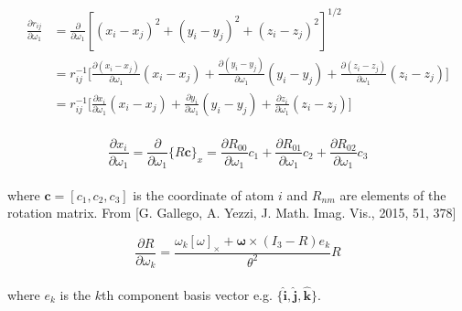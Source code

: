 \documentclass[10pt]{article}
\begin{document}
\begin{equation}
\begin{aligned}
\frac{\partial r_{ij}}{\partial \omega_1} &=  \frac{\partial }{\partial \omega_1} [(x_i - x_j)^2 + (y_i - y_j)^2 + (z_i - z_j)^2]^{1/2} \\
&=r_{ij}^{-1} {\Big [} \frac{\partial (x_i - x_j)}{\partial \omega_1}(x_i - x_j) + \frac{\partial (y_i - y_j)}{\partial \omega_1}(y_i - y_j) + \frac{\partial (z_i - z_j)}{\partial \omega_1}(z_i - z_j)  {\Big ]} \\
&= r_{ij}^{-1} {\Big [} \frac{\partial x_i}{\partial \omega_1}(x_i - x_j) + \frac{\partial y_i}{\partial \omega_1}(y_i - y_j) + \frac{\partial z_i}{\partial \omega_1}(z_i - z_j) {\Big ]}
\end{aligned}
\end{equation}
\\
\begin{equation}
\frac{\partial x_i}{\partial \omega_1} = \frac{\partial }{\partial \omega_1} \{R \boldsymbol{c}\}_x = \frac{\partial R_{00}}{\partial \omega_1}c_1 + \frac{\partial R_{01}}{\partial \omega_1}c_2  + \frac{\partial R_{02}}{\partial \omega_1}c_3
\end{equation}
\\
where $\boldsymbol{c} = [c_1, c_2, c_3]$ is the coordinate of atom $i$ and $R_{nm}$ are elements of the rotation matrix. From [G. Gallego, A. Yezzi,  J. Math. Imag. Vis., 2015, 51, 378]

\begin{equation}
\frac{\partial R}{\partial \omega_k} = \frac{\omega_k [\omega]_\times + \boldsymbol{\omega} \times (I_3 - R)e_k}{\theta^2} R
\end{equation}
\\
where $e_k$ is the $k$th component basis vector e.g. $\{\boldsymbol{\hat{i}}, \boldsymbol{\hat{j}}, \boldsymbol{\hat{k}}\}$.
\end{document}
